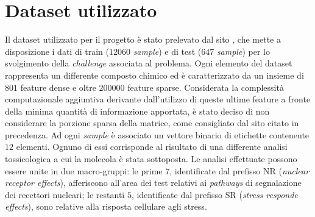 \section{Dataset utilizzato}
Il dataset utilizzato per il progetto è stato prelevato dal sito \cite{dataset_site}, che mette a disposizione i dati di train ($12060$ \textit{sample}) e di test ($647$ \textit{sample}) per lo svolgimento della \textit{challenge} associata al problema.
Ogni elemento del dataset rappresenta un differente composto chimico ed è caratterizzato da un insieme di $801$ feature dense e oltre $200000$ feature sparse. Considerata la complessità computazionale aggiuntiva derivante dall'utilizzo di queste ultime feature a fronte della minima quantità di informazione apportata, è stato deciso di non considerare la porzione sparsa della matrice, come consigliato dal sito citato in precedenza.
Ad ogni \textit{sample} è associato un vettore binario di etichette contenente $12$ elementi.
Ognuno di essi corrisponde al risultato di una differente analisi tossicologica a cui la molecola è stata sottoposta. Le analisi effettuate possono essere unite in due macro-gruppi: le prime $7$, identificate dal prefisso NR (\textit{nuclear receptor effects}), afferiscono all'area dei test relativi ai \textit{pathways} di segnalazione dei recettori nucleari; le restanti $5$, identificate dal prefisso SR (\textit{stress responde effects}), sono relative alla risposta cellulare agli stress.

